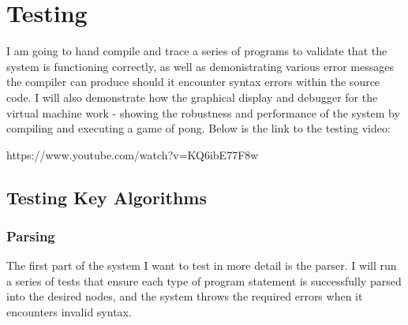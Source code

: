 \section{Testing}
I am going to hand compile and trace a series of programs to validate that the system is functioning correctly, as well as demonistrating various error messages the compiler can produce should it encounter syntax errors within the source code. I will also demonstrate how the graphical display and debugger for the virtual machine work - showing the robustness and performance of the system by compiling and executing a game of pong. Below is the link to the testing video:

https://www.youtube.com/watch?v=KQ6ibE77F8w

 

\subsection{Testing Key Algorithms}

\subsubsection{Parsing}
The first part of the system I want to test in more detail is the parser. I will run a series of tests that ensure each type of program statement is successfully parsed into the desired nodes, and the system throws the required errors when it encounters invalid syntax.

